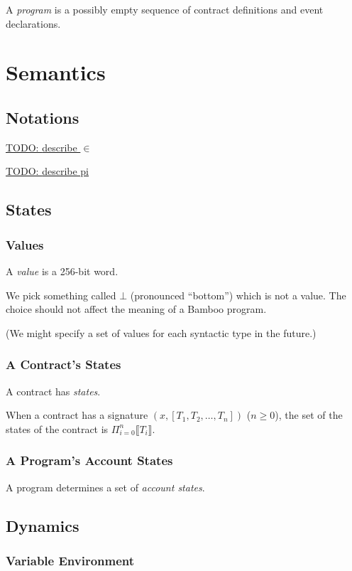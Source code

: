 \documentclass{book}
\newcommand{\todo}[1]{\underline{TODO: {#1}}}
\newcommand{\sem}[1]{\llbracket{#1}\rrbracket}
\begin{document}
A \textit{program} is a possibly empty sequence of contract definitions and event declarations.

\chapter{Semantics}

\section{Notations}

\todo{describe $\in$}

\todo{describe pi}

\section{States}

\subsection{Values}

A \textit{value} is a 256-bit word.

We pick something called $\bot$ (pronounced ``bottom'') which is not a value.  The choice should not affect the meaning of a Bamboo program.

(We might specify a set of values for each syntactic type in the future.)

\subsection{A Contract's States}
A contract has \textit{states}.

When a contract has a signature $(x, [T_1, T_2, \ldots, T_n])$ ($n \ge 0$),
the set of the states of the contract is
$\Pi_{i = 0}^{n} \sem{T_i}$.

\subsection{A Program's Account States}
A program determines a set of \textit{account states}.

\section{Dynamics}

\subsection{Variable Environment}
\end{document}
